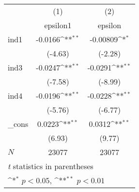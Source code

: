 {
\def\sym#1{\ifmmode^{#1}\else\(^{#1}\)\fi}
\begin{tabular}{l*{2}{c}}
\hline\hline
            &\multicolumn{1}{c}{(1)}&\multicolumn{1}{c}{(2)}\\
            &\multicolumn{1}{c}{epsilon1}&\multicolumn{1}{c}{epsilon}\\
\hline
ind1        &     -0.0166\sym{**}&    -0.00809\sym{*} \\
            &     (-4.63)        &     (-2.28)        \\
ind3        &     -0.0247\sym{**}&     -0.0291\sym{**}\\
            &     (-7.58)        &     (-8.99)        \\
ind4        &     -0.0196\sym{**}&     -0.0228\sym{**}\\
            &     (-5.76)        &     (-6.77)        \\
\_cons      &      0.0223\sym{**}&      0.0312\sym{**}\\
            &      (6.93)        &      (9.77)        \\
\hline
\(N\)       &       23077        &       23077        \\
\hline\hline
\multicolumn{3}{l}{\footnotesize \textit{t} statistics in parentheses}\\
\multicolumn{3}{l}{\footnotesize \sym{*} \(p<0.05\), \sym{**} \(p<0.01\)}\\
\end{tabular}
}
